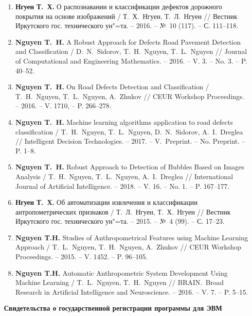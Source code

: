 \begin{enumerate}[label=\arabic*.]
\item \textbf{Нгуен Т.~Х.} О распознавании и классификации дефектов дорожного покрытия на основе изображений / Т.~Х.~Нгуен, Т.~Л.~Нгуен // Вестник Иркутского гос. технического ун"=та. -- 2016. -- №~10 (117). -- С. 111--118.

\item\textbf{Nguyen T.~H.} A Robust Approach for Defects Road Pavement Detection and Classification / D.~N.~Sidorov, T.~H.~Nguyen, T.~L.~Nguyen // Journal of Computational and Engineering Mathematics. -- 2016. -- V. 3. -- No. 3. -- P. 40--52.

\item\textbf{Nguyen T.~H.} On Road Defects Detection and Classification / T.~H.~Nguyen, T.~L.~Nguyen, A.~Zhukov // CEUR Workshop Proceedings. -- 2016. -- V. 1710, -- P. 266--278.

\item\textbf{Nguyen T.~H.} Machine learning algorithms application to road defects classification / T.~H.~Nguyen, T.~L.~Nguyen, D.~N.~Sidorov, A.~I.~Dreglea // Intelligent Decision Technologies. -- 2017. -- V.~Preprint. -- No. Preprint. -- P. 1--8.

\item\textbf{Nguyen T.~H.} Robust Approach to Detection of Bubbles Based on Images Analysis / T.~H.~Nguyen, T.~L.~Nguyen, A.~I.~Dreglea // International Journal of Artificial Intelligence. -- 2018. -- V. 16. -- No. 1. -- P. 167--177.

\item\textbf{Нгуен Т.~Х.} Об автоматизации извлечения и классификации антропометрических признаков / Т.~Л.~Нгуен, Т.~Х.~Нгуен // Вестник Иркутского гос. технического ун"=та. -- 2015. -- №~4 (99). -- С. 17--23.

\item\textbf{Nguyen T.H.} Studies of Anthropometrical Features using Machine Learning Approach / T.~L.~Nguyen, T.~H.~Nguyen, A.~Zhukov // CEUR Workshop Proceedings. -- 2015. -- V. 1452. -- P. 96--105.

\item\textbf{Nguyen T.H.} Automatic Anthropometric System Development Using Machine Learning / T.~L.~Nguyen, T.~H.~Nguyen // BRAIN.~Broad Research in Artificial Intelligence and Neuroscience. -- 2016. -- V. 7. -- P. 5--15.
\end{enumerate}

\noindent\textbf{Свидетельства о государственной регистрации программы для ЭВМ}


